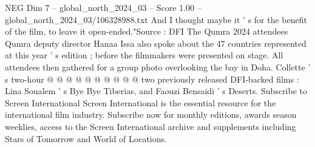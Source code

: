 \begin{textsample}{NEG Dim 7 – global\_north\_2024\_03 – Score 1.00 – global\_north\_2024\_03/106328988.txt}
And I thought maybe it ' s for the benefit of the film, to leave it open-ended."Source : DFI The Qumra 2024 attendees Qumra deputy director Hanaa Issa also spoke about the 47 countries represented at this year ' s edition ; before the filmmakers were presented on stage.
All attendees then gathered for a group photo overlooking the bay in Doha.
Collette ' s two-hour @ @ @ @ @ @ @ @ @ @ two previously released DFI-backed films : Lina Soualem ' s Bye Bye Tiberias, and Faouzi Bensaidi ' s Deserts.
Subscribe to Screen International Screen International is the essential resource for the international film industry.
Subscribe now for monthly editions, awards season weeklies, access to the Screen International archive and supplements including Stars of Tomorrow and World of Locations.

\end{textsample}
